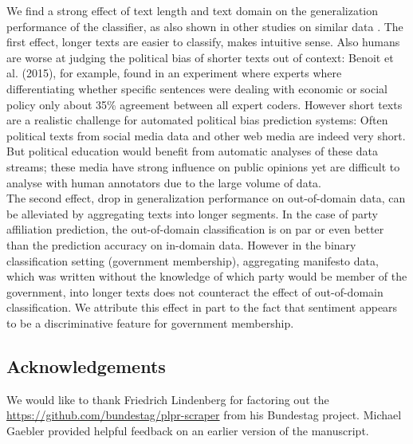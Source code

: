 \documentclass[11pt]{article}
\begin{document}
We find a strong effect of text length and text domain on the generalization performance of the classifier, as also shown in other studies on similar data \cite{Yu2008, Hirst2014}. The first effect, longer texts are easier to classify, makes intuitive sense. Also humans are worse at judging the political bias of shorter texts out of context: Benoit et al. (2015), for example, found in an experiment where experts where differentiating whether specific sentences were dealing with economic or social policy only about 35\% agreement between all expert coders. However short texts are a realistic challenge for automated political bias prediction systems: Often political texts from social media data and other web media are indeed very short. But political education would benefit from automatic analyses of these data streams; these media have strong influence on public opinions yet are difficult to analyse with human annotators due to the large volume of data. \\
The second effect, drop in generalization performance on out-of-domain data, can be alleviated by aggregating texts into longer segments. In the case of party affiliation prediction, the out-of-domain classification is on par or even better than the prediction accuracy on in-domain data. However in the binary classification setting (government membership), aggregating manifesto data, which was written without the knowledge of which party would be member of the government, into longer texts does not counteract the effect of out-of-domain classification. We attribute this effect in part to the fact that sentiment appears to be a discriminative feature for government membership. 

\subsection*{Acknowledgements}
We would like to thank Friedrich Lindenberg for factoring out the \url{https://github.com/bundestag/plpr-scraper} from his Bundestag project. Michael Gaebler provided helpful feedback on an earlier version of the manuscript. \\
%
\newpage
\small{


}
\end{document}
